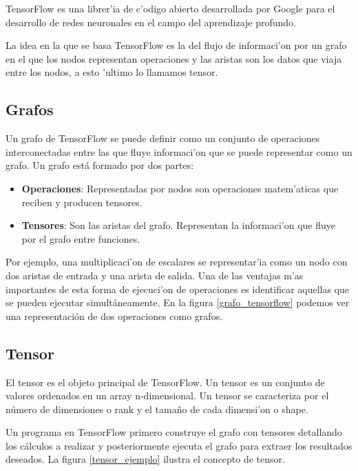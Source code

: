 

TensorFlow es una librer'ia de c'odigo abierto desarrollada por Google para el desarrollo de redes neuronales en el campo del aprendizaje profundo.

La idea en la que se basa TensorFlow es la del flujo de informaci'on por un grafo en el que los nodos representan operaciones y las aristas son los datos que viaja entre los nodos, a esto 'ultimo lo llamamos tensor.

\subsection{Grafos}
Un grafo de TensorFlow se puede definir como un conjunto de operaciones interconectadas entre las que fluye informaci'on que se puede representar como un grafo. Un grafo está formado por dos partes:



\begin{itemize}
\item \textbf{Operaciones}: Representadas por nodos son operaciones matem'aticas que reciben y producen tensores.
\item \textbf{Tensores}: Son las aristas del grafo. Representan la informaci'on que fluye por el grafo entre funciones.
\end{itemize}


Por ejemplo, una multiplicaci'on de escalares se representar'ia como un nodo con dos aristas de entrada y una arista de salida.
Una de las ventajas m'as importantes de esta forma de ejecuci'on de operaciones es identificar aquellas que se pueden ejecutar simultáneamente.
En la figura \ref{grafo_tensorflow} podemos ver una representación de dos operaciones como grafos.


\subsection{Tensor}
El tensor es el objeto principal de TensorFlow. Un tensor es un conjunto de valores ordenados en un array n-dimensional. Un tensor se caracteriza por el número de dimensiones o rank y el tamaño de cada dimensi'on o shape.

Un programa en TensorFlow primero construye el grafo con tensores detallando los cálculos a realizar y posteriormente ejecuta el grafo para extraer los resultados deseados. La figura \ref{tensor_ejemplo} ilustra el concepto de tensor.

